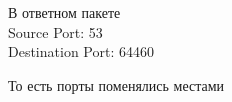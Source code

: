 \documentclass[a4paper,11pt]{article}
\begin{document}
\begin{center}
\label{fig:image}
\end{center}
В ответном пакете \\
Source Port: 53\\
Destination Port: 64460

То есть порты поменялись местами
\end{document}
